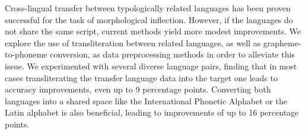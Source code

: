 Cross-lingual transfer between typologically related languages has been proven successful for the task of morphological inflection. However, if the languages do not share the same script, current methods yield more modest improvements. We explore the use of transliteration between related languages, as well as grapheme-to-phoneme conversion, as data preprocessing methods in order to alleviate this issue. We experimented with several diverse language pairs, finding that in most cases transliterating the transfer language data into the target one leads to accuracy improvements, even up to 9 percentage points. Converting both languages into a shared space like the International Phonetic Alphabet or the Latin alphabet is also beneficial, leading to improvements of up to 16 percentage points.
